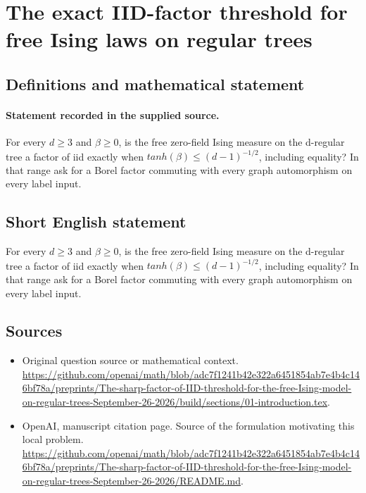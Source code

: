 \documentclass[11pt]{article}
\begin{document}
\section*{The exact IID-factor threshold for free Ising laws on regular trees}\label{statement}
\subsection{Definitions and mathematical statement}
\paragraph{Statement recorded in the supplied source.}
For every $d\geq 3$ and $\beta \geq 0$, is the free zero-field Ising measure on the d-regular tree a factor of iid exactly when $tanh(\beta )\leq (d-1)^{-1/2}$, including equality? In that range ask for a Borel factor commuting with every graph automorphism on every label input.
\subsection{Short English statement}
For every $d\geq 3$ and $\beta \geq 0$, is the free zero-field Ising measure on the d-regular tree a factor of iid exactly when $tanh(\beta )\leq (d-1)^{-1/2}$, including equality? In that range ask for a Borel factor commuting with every graph automorphism on every label input.
\subsection{Sources}
\begin{itemize}
\item[S1] Original question source or mathematical context.
\url{https://github.com/openai/math/blob/adc7f1241b42e322a6451854ab7e4b4c146bf78a/preprints/The-sharp-factor-of-IID-threshold-for-the-free-Ising-model-on-regular-trees-September-26-2026/build/sections/01-introduction.tex}.
\item[S2] OpenAI, manuscript citation page. Source of the formulation motivating this local problem.
\url{https://github.com/openai/math/blob/adc7f1241b42e322a6451854ab7e4b4c146bf78a/preprints/The-sharp-factor-of-IID-threshold-for-the-free-Ising-model-on-regular-trees-September-26-2026/README.md}.
\end{itemize}
\end{document}
